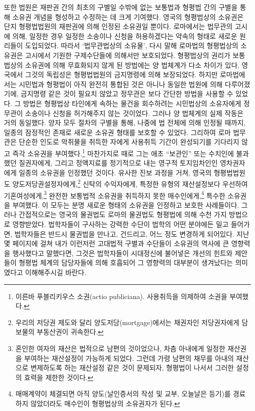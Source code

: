 또한 법원은
재판권 간의 최초의 구별일 수밖에 없는
보통법과 형평법 간의 구별을 통해
소유권 개념을 형성하고 수정하는 데
크게 기여했다.
영국의 형평법상의 소유권은 단지
형평법법원의 재판권에 의해 인정된 소유권일 뿐이다.
로마에서는
법무관의 고시에 의해,
일정한 경우 일정한 소송이나 신청을 허용하겠다는 약속의 형태로
새로운 원리들이 도입되었다.
따라서 `법무관법상의 소유물',
다시 말해 로마법의 형평법상의 소유권은
고시에서 기원한 구제수단들에 의해서만 보호되었다.
형평법상의 권리가 보통법상의 소유권에 의해
무효화되지 않게 된 방법에는 양 법체계가 다소 차이가 있다.
영국에서 그것의 독립성은 형평법법원의
금지명령에 의해 보장되었다.
하지만 로마법에서는
시민법과 형평법이
아직 완전히 통합된 것은 아니나
동일한 법원에 의해 다루어졌기에,
금지명령 같은 것이 필요치 않았고
정무관은 보다 간단한 방법을 사용할 수 있었다.
그 방법은 형평법상 타인에게 속하는 물건을 회수하려는
시민법상의 소유자에게 정무관이 소송이나 신청을 허가해주지 않는 것이었다.
그러나 양 법체계의 실제 작동은 거의 동일했다.
양자 모두 절차의 구별을 통해,
나중에 법 전체에 의해 인정될 때까지,
일종의 잠정적인 존재로 새로운 소유권 형태를
보호할 수 있었다.
그리하여
로마 법무관은
단순한 인도로 악취물을 취득한 자에게
사용취득 기간이 완성되기를 기다리지 않고
즉각 소유권을 부여했다.\footnote{%
  이른바 푸블리키우스 소권(actio publiciana).
  사용취득을 의제하여 소권을 부여했다. }
마찬가지로 때로 그는
애초 ``보관인'' 또는
수치인에 불과했던
질권자에게,
그리고 정액지료를 정기적으로 내는 영구적 토지임차인인
영차권자에게
일종의 소유권을 인정했던 것이다.
유사한 진보 과정을 거쳐,
영국의 형평법법원도
양도저당권설정자에게,\footnote{%
  우리의 저당권 제도와 달리 양도저당(mortgage)에서는
  채권자인 저당권자에게 담보물의 부동산권이 귀속한다. }
신탁의 수익자에게,
특정한 유형의 재산설정보다 우선하여 기혼여성에게,\footnote{%
  혼인한 여자의 재산은 법적으로 남편의 것이었으나,
  차츰 아내에게 일정한 재산권을 부여하는 재산설정이 가능하게 되었다.
  그런데 가령 남편의 채무를 아내의 재산으로 변제하도록 하는 재산설정 같은 것이
  문제되자, 형평법이 나서서 그러한 설정의 효력을 제한한 것이다.
  }
완전한 보통법적 소유권을 취득하지 못한 매수인에게,\footnote{%
  매매계약이 체결되면
  아직 양도(날인증서의 작성 및 교부, 오늘날은 등기)를 경료하지 않았더라도
  매수인이 형평법상의 소유권자가 된다. }%
특수한 소유권을 부여했다.
이 모두는 분명 새로운 형태의 소유권을 인정하고 보호한 사례들이다.
그러나
간접적으로는
영국의 물권법도 로마의 물권법도
형평법에 의해 수천 가지 방법으로 영향받았다.
법학자들이 구사하는 강력한 수단이
법학의 어떤 분야에든
밀고 들어가면,
법학자들은
반드시
물권법을 만나고, 건드리고, 어느 정도 변경하게 되어있다.
지난 몇 페이지에 걸쳐
내가
이런저런 고대법적 구별과 수단들이
소유권의 역사에 큰 영향력을 행사했다고
말했다면,
그것은
법학자들이
시대정신에
불어넣은 개선의 힌트와 제안들이
형평법 체계의 담당자들에 의해 호흡되어
그 영향력의 대부분이 생겨났다는
의미였다고 이해해주시길 바란다.


